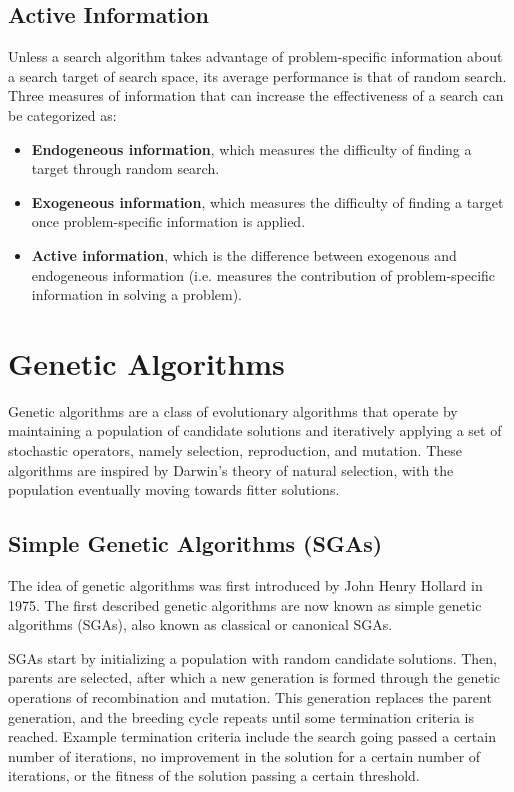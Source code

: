 \documentclass[12pt,titlepage]{article}
\begin{document}
    \subsection{Active Information}
      Unless a search algorithm takes advantage of problem-specific information about a search target of search space, its average performance is that of random search. Three measures of
      information that can increase the effectiveness of a search can be categorized as:
      \begin{itemize}
        \item \textbf{Endogeneous information}, which measures the difficulty of finding a target through random search.
        \item \textbf{Exogeneous information}, which measures the difficulty of finding a target once problem-specific information is applied.
        \item \textbf{Active information}, which is the difference between exogenous and endogeneous information (i.e. measures the contribution of problem-specific information in solving
          a problem).
      \end{itemize}

  \section{Genetic Algorithms}
    Genetic algorithms are a class of evolutionary algorithms that operate by maintaining a population of candidate solutions and iteratively applying a set of stochastic operators,
    namely selection, reproduction, and mutation. These algorithms are inspired by Darwin's theory of natural selection, with the population eventually moving towards fitter solutions.

    \subsection{Simple Genetic Algorithms (SGAs)}
      The idea of genetic algorithms was first introduced by John Henry Hollard in 1975. The first described genetic algorithms are now known as simple genetic algorithms (SGAs), also
      known as classical or canonical SGAs.

      SGAs start by initializing a population with random candidate solutions. Then, parents are selected, after which a new generation is formed through the genetic operations of
      recombination and mutation. This generation replaces the parent generation, and the breeding cycle repeats until some termination criteria is reached. Example termination
      criteria include the search going passed a certain number of iterations, no improvement in the solution for a certain number of iterations, or the fitness of the solution
      passing a certain threshold.
\end{document}
